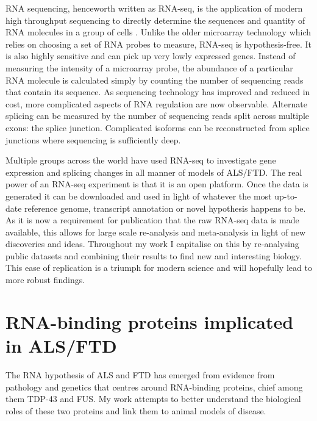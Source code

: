 RNA sequencing, henceworth written as RNA-seq, is the application of modern high throughput sequencing to directly determine the sequences and quantity of RNA molecules in a group of cells \citep{Wang2009}. Unlike the older microarray technology which relies on choosing a set of RNA probes to measure, RNA-seq is hypothesis-free. It is also highly sensitive and can pick up very lowly expressed genes. Instead of measuring the intensity of a microarray probe, the abundance of a particular RNA molecule is calculated simply by counting the number of sequencing reads that contain its sequence. As sequencing technology has improved and reduced in cost, more complicated aspects of RNA regulation are now observable. Alternate splicing can be measured by the number of sequencing reads split across multiple exons: the splice junction. Complicated isoforms can be reconstructed from splice junctions where sequencing is sufficiently deep.

Multiple groups across the world have used RNA-seq to investigate gene expression and splicing changes in all manner of models of ALS/FTD. 
The real power of an RNA-seq experiment is that it is an open platform. 
Once the data is generated it can be downloaded and used in light of whatever the most up-to-date reference genome, transcript annotation or novel hypothesis happens to be. 
As it is now a requirement for publication that the raw RNA-seq data is made available, this allows for large scale re-analysis and meta-analysis in light of new discoveries and ideas. 
Throughout my work I capitalise on this by re-analysing public datasets and combining their results to find new and interesting biology.
This ease of replication is a triumph for modern science and will hopefully lead to more robust findings.


\section{RNA-binding proteins implicated in ALS/FTD}

The RNA hypothesis of ALS and FTD has emerged from evidence from pathology and genetics that centres around RNA-binding proteins, chief among them TDP-43 and FUS.
My work attempts to better understand the biological roles of these two proteins and link them to animal models of disease.

